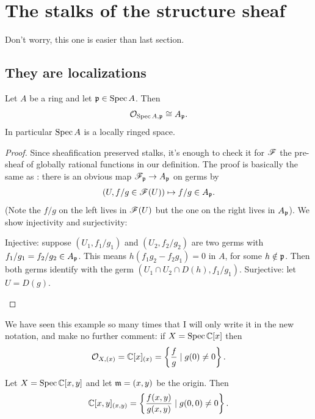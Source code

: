 \section{The stalks of the structure sheaf}

Don't worry, this one is easier than last section.

\subsection{They are localizations}
\begin{theorem}
	Let $A$ be a ring and let $\mathfrak p \in \operatorname{Spec} A$.
	Then \[ \mathcal O_{\operatorname{Spec} A, \mathfrak p} \cong A_\mathfrak p. \]
	In particular $\operatorname{Spec} A$ is a locally ringed space.
\end{theorem}
\begin{proof}
	Since sheafification preserved stalks,
	it's enough to check it for $\mathscr F$ the pre-sheaf
	of globally rational functions in our definition.
	The proof is basically the same as :
	there is an obvious map $\mathscr F_\mathfrak p \to A_\mathfrak p$ on germs by
	\[ \left(U, f/g \in \mathscr F(U) \right)
		\mapsto f/g \in A_\mathfrak p . \]
	(Note the $f/g$ on the left lives in $\mathscr F(U)$
	but the one on the right lives in $A_\mathfrak p$).
	We show injectivity and surjectivity:
	\begin{itemize}
		\ii Injective: suppose $(U_1, f_1 / g_1)$ and $(U_2, f_2 / g_2)$
		are two germs with $f_1/g_1 = f_2/g_2 \in A_\mathfrak p$.
		This means $h(f_1 g_2 - f_2 g_1) = 0$ in $A$, for some $h \notin \mathfrak p$.
		Then both germs identify with
		the germ $(U_1 \cap U_2 \cap D(h), f_1 / g_1)$.
		\ii Surjective: let $U = D(g)$. \qedhere
	\end{itemize}
\end{proof}

\begin{example}
	We have seen this example so many times
	that I will only write it in the new notation,
	and make no further comment:
	if $X = \operatorname{Spec} \mathbb C[x]$ then
	\[ \mathcal O_{X, (x)} = \mathbb C[x]_{(x)}
		= \left\{  \frac fg \mid g(0) \neq 0 \right\}. \]
\end{example}
\begin{example}
	Let $X = \operatorname{Spec} \mathbb C[x,y]$ and let $\mathfrak m = (x,y)$ be the origin.
	Then
	\[ \mathbb C[x,y]_{(x,y)}
		= \left\{ \frac{f(x,y)}{g(x,y)} \mid g(0,0) \neq 0 \right\}. \]
\end{example}

